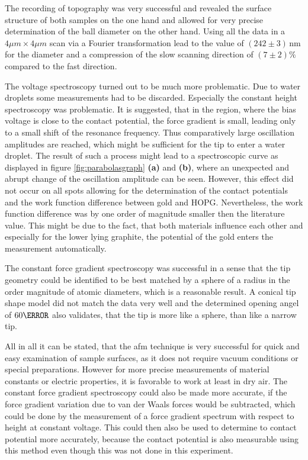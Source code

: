 \documentclass[a4paper]{scrartcl}
\numberwithin{equation}{section}
\numberwithin{figure}{section}
\numberwithin{table}{section}
\begin{document}
The recording of topography was very successful and revealed the surface structure of both samples on the one hand and allowed for very precise determination of the ball diameter on the other hand. Using all the data in a $4\mu m \times 4\mu m$ scan via a Fourier transformation lead to the value of $(242\pm 3)\,\text{nm}$ for the diameter and a compression of the slow scanning direction of $(7\pm2)\%$ compared to the fast direction.

The voltage spectroscopy turned out to be much more problematic. Due to water droplets some measurements had to be discarded. Especially the constant height spectroscopy was problematic. It is suggested, that in the region, where the bias voltage is close to the contact potential, the force gradient is small, leading only to a small shift of the resonance frequency. Thus comparatively large oscillation amplitudes are reached, which might be sufficient for the tip to enter a water droplet. The result of such a process might lead to a spectroscopic curve as displayed in figure \ref{fig:parabolasgraph} \textbf{(a)} and \textbf{(b)}, where an unexpected and abrupt change of the oscillation amplitude can be seen. However, this effect did not occur on all spots allowing for the determination of the contact potentials and the work function difference between gold and HOPG. Nevertheless, the work function difference was by one order of magnitude smaller then the literature value. This might be due to the fact, that both materials influence each other and especially for the lower lying graphite, the potential of the gold enters the measurement automatically.

The constant force gradient spectroscopy was successful in a sense that the tip geometry could be identified to be best matched by a sphere of a radius in the order magnitude of atomic diameters, which is a reasonable result. A conical tip shape model did not match the data very well and  the determined opening angel of $60\degree$ also validates, that the tip is more like a sphere, than like a narrow tip.

All in all it can be stated, that the afm technique is very successful for quick and easy examination of sample surfaces, as it does not require vacuum conditions or special preparations. However for more precise measurements of material constants or electric properties, it is favorable to work at least in dry air. The constant force gradient spectroscopy could also be made more accurate, if the force gradient variation due to van der Waals forces would be subtracted, which could be done by the measurement of a force gradient spectrum with respect to height at constant voltage. This could then also be used to determine to contact potential more accurately, because the contact potential is also measurable using this method even though this was not done in this experiment.
\clearpage
 

\end{document}
